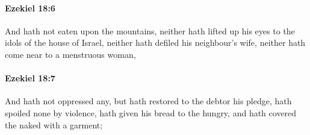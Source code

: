 		\paragraph{Ezekiel 18:6} %
			\label{EZEKIEL-18-6}

			And hath not eaten upon the mountains, neither hath lifted up his eyes to the idols of the house of Israel, neither hath defiled his neighbour’s wife, neither hath come near to a menstruous woman,


		\paragraph{Ezekiel 18:7} %
			\label{EZEKIEL-18-7}

			And hath not oppressed any, but hath restored to the debtor his pledge, hath spoiled none by violence, hath given his bread to the hungry, and hath covered the naked with a garment;

